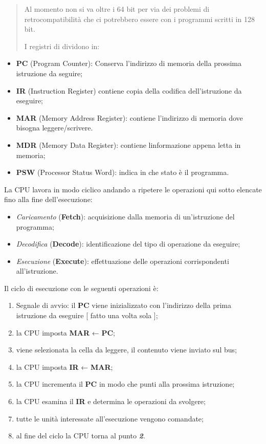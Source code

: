 \begin{quote}
Al momento non si va oltre i 64 bit per via dei problemi di
retrocompatibilità che ci potrebbero essere con i programmi scritti in
128 bit.

I registri di dividono in:
\end{quote}

\begin{itemize}
\item
  \textbf{PC} (Program Counter): Conserva l'indirizzo di memoria della
  prossima istruzione da seguire;
\item
  \textbf{IR} (Instruction Register) contiene copia della codifica
  dell'istruzione da eseguire;
\item
  \textbf{MAR} (Memory Address Register): contiene l'indirizzo di
  memoria dove bisogna leggere/scrivere.
\item
  \textbf{MDR} (Memory Data Register): contiene
  l\textquotesingle informazione appena letta in memoria;
\item
  \textbf{PSW} (Processor Status Word): indica in che stato è il
  programma.
\end{itemize}

La CPU lavora in modo ciclico andando a ripetere le operazioni qui sotto
elencate fino alla fine dell'esecuzione:

\begin{itemize}
\item
  \emph{Caricamento} (\textbf{Fetch}): acquisizione dalla memoria di
  un'istruzione del programma;
\item
  \emph{Decodifica} (\textbf{Decode}): identificazione del tipo di
  operazione da eseguire;
\item
  \emph{Esecuzione} (\textbf{Execute}): effettuazione delle operazioni
  corrispondenti all'istruzione.
\end{itemize}

Il ciclo di esecuzione con le seguenti operazioni è:

\begin{enumerate}
\def\labelenumi{\arabic{enumi}.}
\item
  Segnale di avvio: il \textbf{PC} viene inizializzato con l'indirizzo
  della prima istruzione da eseguire {[} fatto una volta sola {]};
\item
  la CPU imposta \textbf{MAR} ← \textbf{PC};
\item
  viene selezionata la cella da leggere, il contenuto viene inviato sul
  bus;
\item
  la CPU imposta \textbf{IR} ← \textbf{MAR};
\item
  la CPU incrementa il \textbf{PC} in modo che punti alla prossima
  istruzione;
\item
  la CPU esamina il \textbf{IR} e determina le operazioni da svolgere;
\item
  tutte le unità interessate all'esecuzione vengono comandate;
\item
  al fine del ciclo la CPU torna al punto \emph{\textbf{2}}.
\end{enumerate}

